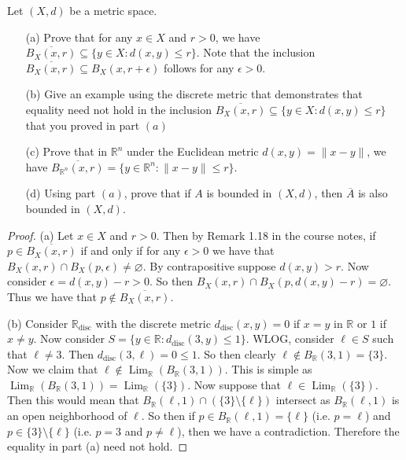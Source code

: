 \documentclass[10pt,reqno]{amsart}
\theoremstyle{definition}
\DeclareMathOperator{\Lim}{Lim}
\newcommand{\rr}{\mathbb R}
\begin{document}
\begin{tcolorbox}[colback=black!5!white,colframe=black!75!black,title= Chapter 4 $\S 1.2$: Exercise 1.14.] Let $(X, d)$ be a metric space. 

\begin{itemize}
	\item [(a)] Prove that for any $x \in X$ and $r>0$, we have $\overline{B_X(x,r)} \subseteq \{ y \in X \colon d(x,y) \leq r \}$. Note that the inclusion $\overline{B_X(x,r) } \subseteq B_X(x,r+\epsilon)$ follows for any $\epsilon > 0$. 
	\item [(b)] Give an example using the discrete metric that demonstrates that equality need not hold in the inclusion $\overline {B_X(x,r)} \subseteq \{ y \in X \colon d(x,y) \leq r \}$ that you proved in part $(a)$
	\item [(c)] Prove that in $\rr^n$ under the Euclidean metric $d(x,y) = \|x- y\|$, we have $\overline{B_{\rr^n}(x,r)} = \{ y \in \rr^n \colon \|x -y\| \leq r \}$. 
	\item [(d)] Using part $(a)$, prove that if $A$ is bounded in $(X,d)$, then $\overline{A}$ is also bounded in $(X,d)$.
\end{itemize}
\tcblower 
\begin{proof} (a) Let $x \in X$ and $r > 0$. Then by Remark 1.18 in the course notes, if $p \in \overline{B_X(x,r)}$ if and only if for any $\epsilon > 0$ we have that $B_X(x,r) \cap B_X(p, \epsilon) \neq \varnothing$. By contrapositive suppose $d(x,y) > r$. Now consider $\epsilon = d(x,y) - r> 0$. So then $B_X(x,r) \cap B_X(p, d(x,y) -r) = \varnothing$. Thus we have that $p \notin \overline{B_X(x,r)}$.

(b) Consider $\rr_{\text{disc}}$ with the discrete metric $d_{\text{disc}} (x,y) = 0$ if $x = y$ in $\rr$ or $1$ if $x \neq y$. Now consider $S = \{y \in \rr \colon d_{\text{disc}}(3, y) \leq 1 \}$. WLOG, consider $\ell \in S$ such that $\ell \neq 3$. Then $d_{\text{disc}} (3,\ell ) = 0 \leq 1$. So then clearly $\ell \notin B_\rr (3,1) = \{ 3 \}$. Now we claim that $\ell \notin \Lim_\rr( B_\rr (3,1) )$. This is simple as $\Lim_\rr (B_\rr (3,1)) = \Lim_ \rr (\{ 3 \})$. Now suppose that $\ell \in \Lim_\rr (\{ 3 \})$. Then this would mean that $B_\rr (\ell, 1) \cap ( \{ 3 \} \setminus \{ \ell \})$ intersect as $B_\rr( \ell, 1)$ is an open neighborhood of $\ell$. So then if $p \in B_\rr (\ell, 1) = \{\ell \}$ (i.e. $p = \ell$) and $p \in \{3 \} \setminus \{ \ell \}$ (i.e. $p = 3$ and $p \neq \ell$), then we have a contradiction. Therefore the equality in part (a) need not hold.


\end{proof}
\end{tcolorbox}
\end{document}
